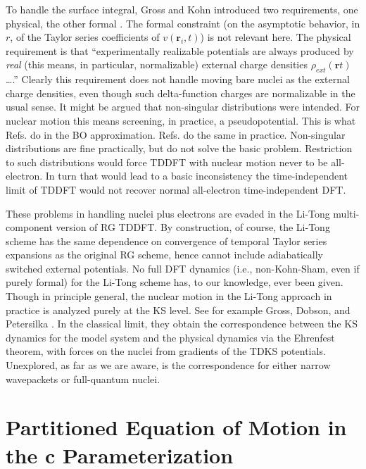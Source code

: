 \documentclass[aps,preprint]{revtex4}%
\begin{document}
To handle the surface integral, Gross and Kohn introduced two requirements,
one physical, the other formal \cite{GrossKohn90}. The formal constraint (on
the asymptotic behavior, in $r$, of the Taylor series coefficients of
$v(\mathbf{r}_{i},t)$) is not relevant here. The physical requirement is that
``experimentally realizable potentials are always produced by \emph{real}
(this means, in particular, normalizable) external charge densities
$\rho_{ext}(\mathbf{r}t)$ \ldots.'' Clearly this requirement does not handle
moving bare nuclei as the external charge densities, even though such
delta-function charges are normalizable in the usual sense. It might be argued
that non-singular distributions were intended. For nuclear motion this means
screening, in practice, a pseudopotential. This is what Refs.
\cite{Teil92,Fois88} do in the BO approximation. Refs.
\cite{Saalmann96,Knospe99} do the same in practice. Non-singular distributions
are fine practically, but do not solve the basic problem. Restriction to such
distributions would force TDDFT with nuclear motion never to be all-electron.
In turn that would lead to a basic inconsistency the time-independent limit of
TDDFT would not recover normal all-electron time-independent DFT.

These problems in handling nuclei plus electrons are evaded in the Li-Tong
\cite{LiTong86} multi-component version of RG TDDFT. By construction, of
course, the Li-Tong scheme has the same dependence on convergence of temporal
Taylor series expansions as the original RG scheme, hence cannot include
adiabatically switched external potentials. No full DFT dynamics (i.e.,
non-Kohn-Sham, even if purely formal) for the Li-Tong scheme has, to our
knowledge, ever been given. Though in principle general, the nuclear motion in
the Li-Tong approach in practice is analyzed purely at the KS level. See for
example Gross, Dobson, and Petersilka \cite{Gross96}. In the classical limit,
they obtain the correspondence between the KS dynamics for the model system
and the physical dynamics via the Ehrenfest theorem, with forces on the nuclei
from gradients of the TDKS potentials. Unexplored, as far as we are aware, is
the correspondence for either narrow wavepackets or full-quantum
nuclei.\cite{Xchneglect}

\section{Partitioned Equation of Motion in the $\mathbf{c}$ Parameterization}
\end{document}
